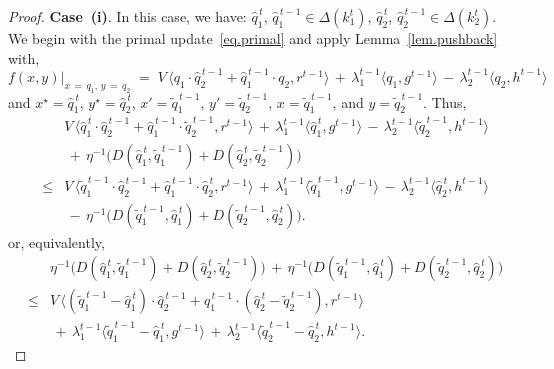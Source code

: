 \documentclass[12pt, final]{l4dc2023}
\begin{document}
\begin{proof}
	\noindent\textbf{Case~(i)}.	In this case, we have: $ \hat q_1^{\,t}$, $\hat q_1^{\,t-1}\in \Delta(k_1^t)$, $ \hat q_2^{\,t}$, $\hat q_2^{\,t-1}\in \Delta(k_2^t)$. 
	We begin with the primal update~\eqref{eq.primal} and apply Lemma~\ref{lem.pushback} with, 
	\[
	f(x,y) \vert_{x\,=\,q_1,\, y\,=\,q_2} 
	\;=\;
	V\, \big\langle{q_1\cdot \hat q_2^{\,t-1}+\hat q_1^{\,t-1}\cdot q_2},{r^{t-1}}\big\rangle 
	\,+\,
	\lambda_1^{t-1} \langle{q_1},{g^{t-1}}\rangle 
	\,-\,\lambda_2^{t-1} \langle{q_2},{h^{t-1}}\rangle 
	\]
	and $x^\star = \hat q_1^{\,t}$, $y^\star= \hat q_2^{\,t}$, $x' = \tilde q_1^{\,t-1}$, $y'=\tilde q_2^{\,t-1}$, $x = \tilde q_1^{\,t-1}$, and $y=\tilde q_2^{\,t-1}$. Thus, 
	\[
	\begin{array}{rcl}
	&& \!\!\!\! \!\!\!\! \!\!
	V\, \big\langle{\hat q_1^{\,t}\cdot \hat q_2^{\,t-1}+\hat q_1^{\,t-1}\cdot  \tilde q_2^{\,t-1}},{r^{t-1}}\big\rangle 
	\,+\,
	\lambda_1^{t-1} \langle{\hat q_1^{\,t}},{g^{t-1}}\rangle 
	\,-\,
	\lambda_2^{t-1} \langle{ \tilde q_2^{\,t-1}},{h^{t-1}}\rangle 
	\\[0.2cm]
	&& 
	\,+\, \eta^{-1} \big(D(\hat q_1^{\,t},\tilde q_1^{\,t-1}) + D(\hat q_2^{\,t}, \tilde q_2^{\,t-1})\big)
	\\[0.2cm]
	&\leq& V\, \big\langle{ \tilde q_1^{\,t-1}\cdot \hat q_2^{\,t-1}+\hat q_1^{\,t-1}\cdot \hat q_2^{\,t}},{r^{t-1}}\big\rangle 
	\,+\,
	\lambda_1^{t-1} \langle{ \tilde q_1^{\,t-1}},{g^{t-1}}\rangle 
	\,-\,
	\lambda_2^{t-1} \langle{ \hat q_2^{\,t}},{h^{t-1}}\rangle 
	\\[0.2cm]
	&&
	\,-\, \eta^{-1} \big(D( \tilde q_1^{\,t-1},\hat q_1^{\,t}) + D( \tilde q_2^{\,t-1}, \hat q_2^{\,t}) \big).
	\end{array}
	\]
	or, equivalently,
	\begin{equation}\label{eq.pushback_I_s}
	\begin{array}{rcl}
	&& \!\!\!\! \!\!\!\!  \!\! 
	\eta^{-1} \big(D(\hat q_1^{\,t},\tilde q_1^{\,t-1}) + D(\hat q_2^{\,t}, \tilde q_2^{\,t-1})\big)
	\,+\,
	\eta^{-1} \big(D( \tilde q_1^{\,t-1},\hat q_1^{\,t}) + D( \tilde q_2^{\,t-1}, \hat q_2^{\,t}) \big)
	\\[0.2cm]
	&\leq&  V\, \big\langle{ (\tilde q_1^{\,t-1} -\hat q_1^{\,t} )\cdot \hat q_2^{\,t-1}+\hat q_1^{\,t-1}\cdot (\hat q_2^{\,t} - \tilde q_2^{\,t-1} )},{r^{t-1}}\big\rangle 
	\\[0.2cm]
	&& 
	\,+\,
	\lambda_1^{t-1} \langle{ \tilde q_1^{\,t-1} - \hat q_1^{\,t} },{g^{t-1}}\rangle 
	\,+\,
	\lambda_2^{t-1} \langle{ \tilde q_2^{\,t-1} - \hat q_2^{\,t}},{h^{t-1}}\rangle.
	\end{array}

\end{equation}
\end{proof}
\end{document}
